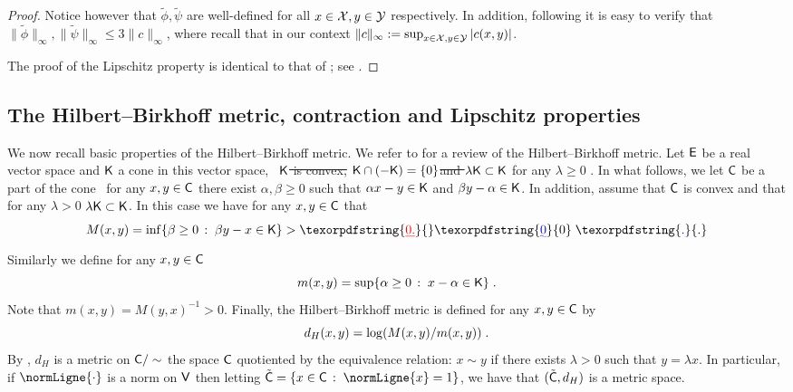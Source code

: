 \documentclass[11pt,a4paper]{article}
\providecommand{\DIFaddtex}[1]{{\protect\color{blue}\uwave{#1}}} %
\providecommand{\DIFdeltex}[1]{{\protect\color{red}\sout{#1}}}                      %
\providecommand{\DIFaddbegin}{} %
\providecommand{\DIFaddend}{} %
\providecommand{\DIFdelbegin}{} %
\providecommand{\DIFdelend}{} %
\providecommand{\DIFadd}[1]{\texorpdfstring{\DIFaddtex{#1}}{#1}} %
\providecommand{\DIFdel}[1]{\texorpdfstring{\DIFdeltex{#1}}{}} %
\begin{document}
\begin{proof}
 Notice however that $\tilde\phi, \tilde\psi$ are well-defined for all $x\in \mathcal{X}, y\in \mathcal{Y}$ respectively. In addition, following \cite[Lemma~3.1]{carlier2021linear} it is easy to verify that $\|\tilde\phi\|_\infty, \|\tilde\psi\|_\infty\leq 3\|c\|_\infty$, where recall that in our context $\|c\|_\infty := \sup_{x\in \mathcal{X}, y\in \mathcal{Y}} |c(x,y)|$. 

 The proof of the Lipschitz property is identical to that of ; see .
\end{proof}


\subsection{The Hilbert--Birkhoff metric, contraction and Lipschitz properties}
\label{sec:hilb-birkh-metr}

We now recall basic properties of the Hilbert--Birkhoff metric. We refer to
\cite{lemmens2013birkhoff,kohlberg1982contraction,bushell1973hilbert} for a
review of the Hilbert--Birkhoff metric. Let $\mathsf{E}$ be a real vector space and
$\msk$ a cone in this vector space, \ie \ \DIFdelbegin \DIFdel{$\msk$ is convex, }\DIFdelend $\mathsf{K} \cap (-\mathsf{K}) = \{0\}$\DIFdelbegin \DIFdel{and $\lambda \msk \subset \msk$ }\DIFdelend \DIFaddbegin \DIFadd{, }\DIFaddend for any
$\lambda \geq 0$ \DIFaddbegin \DIFadd{$\lambda \msk \subset \msk$ and $\msk$ is convex}\DIFaddend . In what
follows, we let $\mathsf{C}$ be a part of the cone \ie \ for any $x, y \in \mathsf{C}$ there
exist $\alpha, \beta \geq 0$ such that $\alpha x - y \in \mathsf{K}$ and
$\beta y -\alpha \in \mathsf{K}$. In addition, assume that $\mathsf{C}$ is convex and that
for any $\lambda > 0$ $\lambda \msk \subset \msk$. In this case we have for
any $x, y \in \mathsf{C}$ that
\begin{equation}
  M(x,y) = \inf \ensembleLigne{\beta \geq 0}{\beta y - x \in \msk} > \DIFdelbegin \DIFdel{0. 
}\DIFdelend \DIFaddbegin \DIFadd{0 }\eqsp \DIFadd{. 
}\DIFaddend \end{equation}
Similarly we define for any $x, y \in \mathsf{C}$
\begin{equation}
  m(x,y) = \sup \ensembleLigne{\alpha \geq 0}{x - \alpha \in \msk} \DIFaddbegin \eqsp \DIFaddend . 
\end{equation}
Note that $m(x,y) = M(y,x)^{-1} > 0$. Finally, the Hilbert--Birkhoff metric is
defined for any $x, y \in \mathsf{C}$ by
\begin{equation}
  d_H(x,y) = \log(M(x,y) / m(x,y)) \DIFaddbegin \eqsp \DIFaddend . 
\end{equation}
By \cite[Lemma 2.1]{lemmens2013birkhoff}, $d_H$ is a metric on $\mathsf{C}/\sim$ the
space $\mathsf{C}$ quotiented by the equivalence relation: $x \sim y$ if there exists
$\lambda > 0$ such that $y = \lambda x$. In particular, if $\normLigne{\cdot}$
is a norm on $\mathsf{V}$ then letting
$\tilde{\msc} = \ensembleLigne{x \in \msc}{\normLigne{x}=1}$, we have that
$(\tilde{\mathsf{C}},d_H)$ is a metric space.
\end{document}
